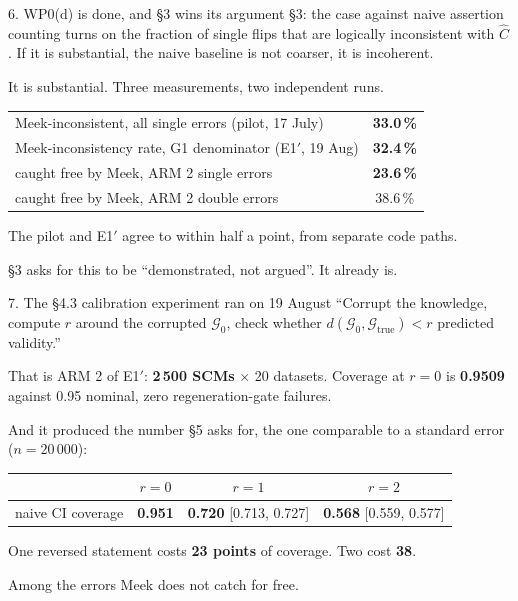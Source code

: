 \documentclass[10pt,aspectratio=169]{beamer}
\begin{document}
\begin{frame}{6. WP0(d) is done, and \S3 wins its argument}
\S3: the case against naive assertion counting turns on the fraction of single flips that are
logically inconsistent with $\hat{C}$. If it is substantial, the naive baseline is not coarser, it is
incoherent.

\begin{center}
\Large It is substantial. Three measurements, two independent runs.
\end{center}

\begin{center}
\begin{tabular}{lc}
\toprule
Meek-inconsistent, all single errors (pilot, 17 July) & \textbf{33.0\,\%} \\
Meek-inconsistency rate, G1 denominator (E1$'$, 19 Aug) & \textbf{32.4\,\%} \\
caught free by Meek, ARM 2 single errors & \textbf{23.6\,\%} \\
caught free by Meek, ARM 2 double errors & 38.6\,\% \\
\bottomrule
\end{tabular}
\end{center}

\medskip
The pilot and E1$'$ agree to within half a point, from separate code paths.

\medskip
\S3 asks for this to be ``demonstrated, not argued''. It already is.
\end{frame}

\begin{frame}{7. The \S4.3 calibration experiment ran on 19 August}
``Corrupt the knowledge, compute $r$ around the corrupted $\mathcal{G}_0$, check whether
$d(\mathcal{G}_0, \mathcal{G}_{\text{true}}) < r$ predicted validity.''

\medskip
That is ARM 2 of E1$'$: \textbf{2\,500 SCMs} $\times$ 20 datasets. Coverage at $r = 0$ is
\textbf{0.9509} against 0.95 nominal, zero regeneration-gate failures.

\medskip
And it produced the number \S5 asks for, the one comparable to a standard error ($n = 20\,000$):

\begin{center}
\begin{tabular}{lccc}
\toprule
 & $r = 0$ & $r = 1$ & $r = 2$ \\
\midrule
naive CI coverage & \textbf{0.951} & \textbf{0.720} \tiny[0.713, 0.727] & \textbf{0.568} \tiny[0.559, 0.577] \\
\bottomrule
\end{tabular}
\end{center}

\begin{block}{}
\centering \large One reversed statement costs \textbf{23 points} of coverage. Two cost \textbf{38}.
\end{block}
\small Among the errors Meek does not catch for free.
\end{frame}
\end{document}
